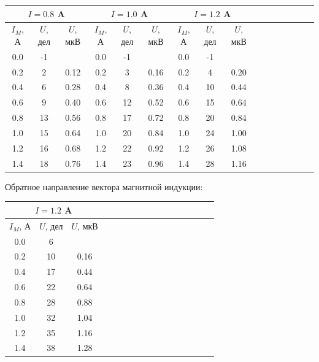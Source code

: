 \documentclass[14pt]{article}
\begin{document}
\vspace{0.5cm}
\begin{tabular}{|c|c|c|c|c|c|c|c|c|c|c|c|c|c|c|c|}
\hline
\multicolumn{3}{|c|}{$I = 0.8$ A}			&	\multicolumn{3}{|c|}{$I = 1.0$ A}			&	\multicolumn{3}{|c|}{$I = 1.2$ A}			\\
\hline
$I_M$, А	&	$U$, дел	&	$U$, мкВ	&	$I_M$, А	&	$U$, дел	&	$U$, мкВ	&	$I_M$, А	&	$U$, дел	&	$U$, мкВ	\\
\hline
0.0			&	-1			&				&	0.0			&	-1			&				&	0.0			&	-1			&				\\
\hline
0.2			&	2			&	0.12		&	0.2			&	3			&	0.16		&	0.2			&	4			&	0.20		\\
\hline
0.4			&	6			&	0.28		&	0.4			&	8			&	0.36		&	0.4			&	10			&	0.44		\\
\hline
0.6			&	9			&	0.40		&	0.6			&	12			&	0.52		&	0.6			&	15			&	0.64		\\
\hline
0.8			&	13			&	0.56		&	0.8			&	17			&	0.72		&	0.8			&	20			&	0.84		\\
\hline
1.0			&	15			&	0.64		&	1.0			&	20			&	0.84		&	1.0			&	24			&	1.00		\\
\hline
1.2			&	16			&	0.68		&	1.2			&	22			&	0.92		&	1.2			&	26			&	1.08		\\
\hline
1.4			&	18			&	0.76		&	1.4			&	23			&	0.96		&	1.4			&	28			&	1.16		\\
\hline
\end{tabular}

\vspace{1cm}
Обратное направление вектора магнитной индукции:

\begin{center}
\begin{tabular}{|c|c|c|c|c|c|c|c|c|c|c|c|c|c|c|c|}
\hline
\multicolumn{3}{|c|}{$I = 1.2$ A}			\\
\hline
$I_M$, А	&	$U$, дел	&	$U$, мкВ	\\
\hline
0.0			&	6			&				\\
\hline
0.2			&	10			&	0.16		\\
\hline
0.4			&	17			&	0.44		\\
\hline
0.6			&	22			&	0.64		\\
\hline
0.8			&	28			&	0.88		\\
\hline
1.0			&	32			&	1.04		\\
\hline
1.2			&	35			&	1.16		\\
\hline
1.4			&	38			&	1.28		\\
\hline
\end{tabular}
\end{center}
\end{document}
